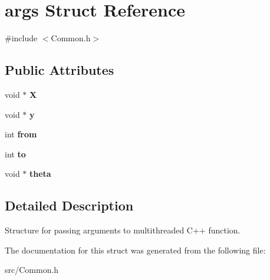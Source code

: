\hypertarget{structargs}{\section{args Struct Reference}
\label{structargs}
}


{\ttfamily \#include $<$Common.\-h$>$}

\subsection*{Public Attributes}
\begin{DoxyCompactItemize}
\item 
\hypertarget{structargs_a630fde6767dd27969c66d1bcc1fc27ac}{void $\ast$ {\bfseries X}}\label{structargs_a630fde6767dd27969c66d1bcc1fc27ac}

\item 
\hypertarget{structargs_ad7454c5499e17c7464165b733c92caec}{void $\ast$ {\bfseries y}}\label{structargs_ad7454c5499e17c7464165b733c92caec}

\item 
\hypertarget{structargs_ac1f8cee8690ba4a147b4152958e65a17}{int {\bfseries from}}\label{structargs_ac1f8cee8690ba4a147b4152958e65a17}

\item 
\hypertarget{structargs_a9d71349fdf4133f93cb495fe2b5ed49a}{int {\bfseries to}}\label{structargs_a9d71349fdf4133f93cb495fe2b5ed49a}

\item 
\hypertarget{structargs_ac228a5965699f39a0751d3e859fa7a3a}{void $\ast$ {\bfseries theta}}\label{structargs_ac228a5965699f39a0751d3e859fa7a3a}

\end{DoxyCompactItemize}


\subsection{Detailed Description}
Structure for passing arguments to multithreaded C++ function. 

The documentation for this struct was generated from the following file\-:\begin{DoxyCompactItemize}
\item 
src/Common.\-h\end{DoxyCompactItemize}
